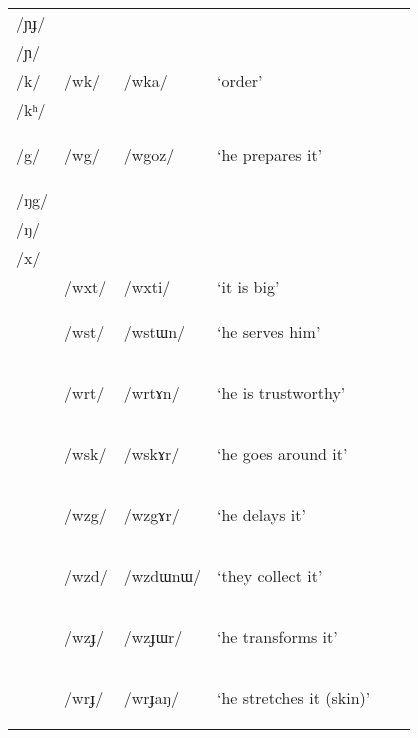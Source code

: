 \documentclass[12pt]{article}
\newcommand{\ipa}[1]{\mbox{\phon/#1/}}
\newcommand{\deux}[1]{\ipa{#1}\addtocounter{2clusters}{1}}
\newcommand{\trois}[1]{\ipa{#1}\addtocounter{3clusters}{1}}
\newcommand{\tib}[1]{\cellcolor{lightgray}\textbf{#1}}
\newcommand{\resetcounters}[2]{
\newcounter{#1}
\newcounter{#2}
 \setcounter{#1}{\value{2clusters}}
  \setcounter{#2}{\value{3clusters}}
 \setcounter{2clusters}{0}
  \setcounter{3clusters}{0}
}
\begin{document}
\begin{table}
\begin{tabular}{llllll}
\ipa{ɲɟ}  & 	  & 	  & 	  & 	\\
\ipa{ɲ}  & 	  & 	  & 	  & 	\\
\ipa{k}  & 	 \deux{wk}  & 	 \ipa{wka}  & 	 `order'  & 	\\
\ipa{kʰ}  & 	  & 	  & 	  & 	\\
\ipa{g}  & 	 \deux{wg}  \tib{} & 	 \ipa{wgoz}  & 	 `he prepares it'  & 	\\
\ipa{ŋg}  & 	  & 	  & 	  & 	\\
\ipa{ŋ}  & 	  & 	  & 	  & 	\\
\ipa{x}  & 	  & 	  & 	  & 	\\
\midrule 
 & 	 \trois{wxt}  & 	 \ipa{wxti}  & 	 `it is big' & 	\\
 & 	 \trois{wst} \tib{}  & 	 \ipa{wstɯn}  & 	 `he serves him'  & 	\\
 & 	 \trois{wrt}  \tib{}  & 	 \ipa{wrtɤn}  & 	 `he is trustworthy' & 	\\
 & 	 \trois{wsk}  \tib{}  & 	 \ipa{wskɤr}  & 	 `he goes around it'  & 	\\
 & 	 \trois{wzg}  \tib{}  & 	 \ipa{wzgɤr}  & 	 `he delays it'  & 	\\
 & 	 \trois{wzd}  \tib{}  & 	 \ipa{wzdɯnɯ}  & 	 `they collect it'  & 	\\
 & 	 \trois{wzɟ}  \tib{}  & 	 \ipa{wzɟɯr}  & 	 `he transforms it'  & 	\\
 & 	 \trois{wrɟ}  \tib{}  & 	 \ipa{wrɟaŋ}  & 	 `he stretches it (skin)'  & 	\\
\bottomrule
\end{tabular}
\end{table}
 \resetcounters{2wC}{3wC} 
 
\end{document}
